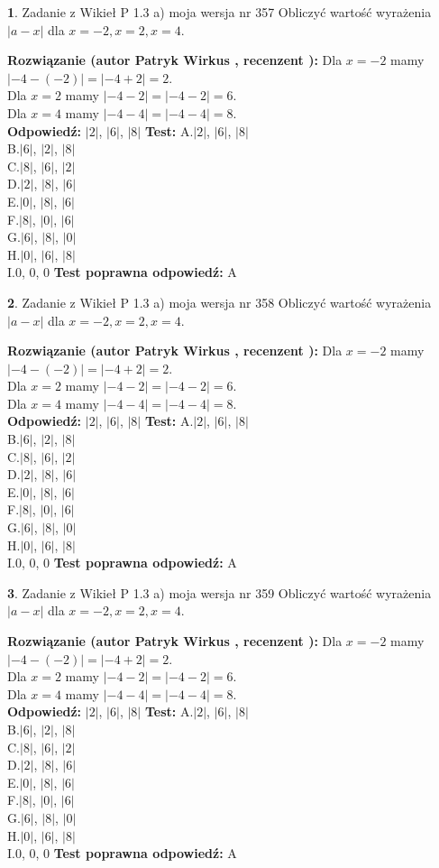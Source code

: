 \documentclass[12pt, a4paper]{article}
\theoremstyle{definition} %
\newtheorem{zad}{}
\newcommand{\zadStart}[1]{\begin{zad}#1\newline}
\newcommand{\zadStop}{\end{zad}}
\newcommand{\rozwStart}[2]{\noindent \textbf{Rozwiązanie (autor #1 , recenzent #2): }\newline}
\newcommand{\rozwStop}{\newline}
\newcommand{\odpStart}{\noindent \textbf{Odpowiedź:}\newline}
\newcommand{\odpStop}{\newline}
\newcommand{\testStart}{\noindent \textbf{Test:}\newline}
\newcommand{\testStop}{\newline}
\newcommand{\kluczStart}{\noindent \textbf{Test poprawna odpowiedź:}\newline}
\newcommand{\kluczStop}{\newline}
\begin{document}
\zadStart{Zadanie z Wikieł P 1.3 a) moja wersja nr 357}
Obliczyć wartość wyrażenia $|a - x|$ dla $x=-2,x=2,x=4$.
\zadStop
\rozwStart{Patryk Wirkus}{}
Dla $x = -2$ mamy $|-4 - (-2)| = |-4 + 2| = 2$.\\
Dla $x = 2$ mamy $|-4 - 2| = |-4 - 2| = 6$.\\
Dla $x = 4$ mamy $|-4 - 4| = |-4 - 4| = 8$.\\
\rozwStop
\odpStart
$|2|$, $|6|$, $|8|$
\odpStop
\testStart
A.$|2|$, $|6|$, $|8|$\\
B.$|6|$, $|2|$, $|8|$\\
C.$|8|$, $|6|$, $|2|$\\
D.$|2|$, $|8|$, $|6|$\\
E.$|0|$, $|8|$, $|6|$\\
F.$|8|$, $|0|$, $|6|$\\
G.$|6|$, $|8|$, $|0|$\\
H.$|0|$, $|6|$, $|8|$\\
I.$0$, $0$, $0$
\testStop
\kluczStart
A
\kluczStop



\zadStart{Zadanie z Wikieł P 1.3 a) moja wersja nr 358}
Obliczyć wartość wyrażenia $|a - x|$ dla $x=-2,x=2,x=4$.
\zadStop
\rozwStart{Patryk Wirkus}{}
Dla $x = -2$ mamy $|-4 - (-2)| = |-4 + 2| = 2$.\\
Dla $x = 2$ mamy $|-4 - 2| = |-4 - 2| = 6$.\\
Dla $x = 4$ mamy $|-4 - 4| = |-4 - 4| = 8$.\\
\rozwStop
\odpStart
$|2|$, $|6|$, $|8|$
\odpStop
\testStart
A.$|2|$, $|6|$, $|8|$\\
B.$|6|$, $|2|$, $|8|$\\
C.$|8|$, $|6|$, $|2|$\\
D.$|2|$, $|8|$, $|6|$\\
E.$|0|$, $|8|$, $|6|$\\
F.$|8|$, $|0|$, $|6|$\\
G.$|6|$, $|8|$, $|0|$\\
H.$|0|$, $|6|$, $|8|$\\
I.$0$, $0$, $0$
\testStop
\kluczStart
A
\kluczStop



\zadStart{Zadanie z Wikieł P 1.3 a) moja wersja nr 359}
Obliczyć wartość wyrażenia $|a - x|$ dla $x=-2,x=2,x=4$.
\zadStop
\rozwStart{Patryk Wirkus}{}
Dla $x = -2$ mamy $|-4 - (-2)| = |-4 + 2| = 2$.\\
Dla $x = 2$ mamy $|-4 - 2| = |-4 - 2| = 6$.\\
Dla $x = 4$ mamy $|-4 - 4| = |-4 - 4| = 8$.\\
\rozwStop
\odpStart
$|2|$, $|6|$, $|8|$
\odpStop
\testStart
A.$|2|$, $|6|$, $|8|$\\
B.$|6|$, $|2|$, $|8|$\\
C.$|8|$, $|6|$, $|2|$\\
D.$|2|$, $|8|$, $|6|$\\
E.$|0|$, $|8|$, $|6|$\\
F.$|8|$, $|0|$, $|6|$\\
G.$|6|$, $|8|$, $|0|$\\
H.$|0|$, $|6|$, $|8|$\\
I.$0$, $0$, $0$
\testStop
\kluczStart
A
\kluczStop
\end{document}
